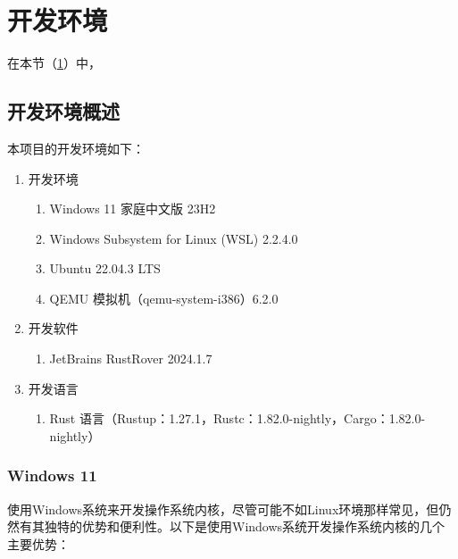 \section{开发环境}\label{sec:DevelopmentEnvironment}

在本节（\cref{sec:DevelopmentEnvironment}）中，

\subsection{开发环境概述}

本项目的开发环境如下：

\begin{enumerate}
    \item 开发环境
          \begin{enumerate}
              \item Windows 11 家庭中文版 23H2
              \item Windows Subsystem for Linux (WSL) 2.2.4.0
              \item Ubuntu 22.04.3 LTS
              \item QEMU 模拟机（qemu-system-i386）6.2.0
          \end{enumerate}
    \item 开发软件
          \begin{enumerate}
              \item JetBrains RustRover 2024.1.7
          \end{enumerate}
    \item 开发语言
          \begin{enumerate}
              \item Rust 语言（Rustup：1.27.1，Rustc：1.82.0-nightly，Cargo：1.82.0-nightly）
          \end{enumerate}
\end{enumerate}

\subsubsection{Windows 11}

使用Windows系统来开发操作系统内核，尽管可能不如Linux环境那样常见，但仍然有其独特的优势和便利性。以下是使用Windows系统开发操作系统内核的几个主要优势：

